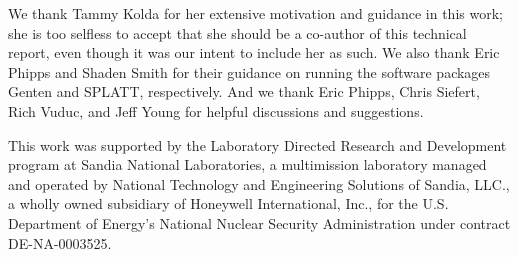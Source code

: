 We thank Tammy Kolda for her extensive motivation and guidance in
this work; she is too selfless to accept that she should be a co-author
of this technical report, even though it was our intent to include her as such.
We also thank Eric Phipps and Shaden Smith for their guidance on
running the software packages Genten and SPLATT, respectively.
And we thank Eric Phipps, Chris Siefert, Rich Vuduc, and Jeff Young for 
helpful discussions and suggestions.

This work was supported by the Laboratory Directed Research and Development 
program
at 
Sandia National Laboratories, a multimission laboratory managed and
operated by National Technology and Engineering Solutions of Sandia, LLC.,
a wholly owned subsidiary of Honeywell International, Inc., for the U.S.
Department of Energy's National Nuclear Security Administration under
contract DE-NA-0003525.
